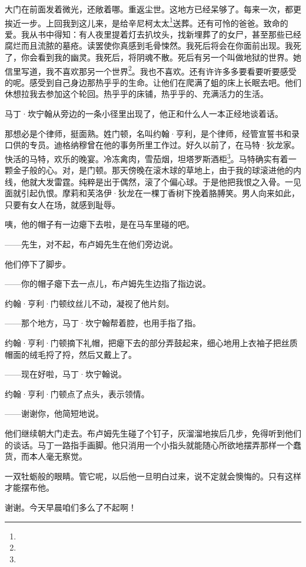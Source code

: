 \par 大门在前面发着微光，还敞着哪。重返尘世。这地方已经呆够了。每来一次，都更挨近一步。上回我到这儿来，是给辛尼柯太太\footnote{}送葬。还有可怜的爸爸。致命的爱。我从书中得知：有人夜里提着灯去扒坟头，找新埋葬了的女尸，甚至那些已经腐烂而且流脓的墓疮。读罢使你真感到毛骨悚然。我死后将会在你面前出现。我死了，你会看到我的幽灵。我死后，将阴魂不散。死后有另一个叫做地狱的世界。她信里写道，我不喜欢那另一个世界\footnote{}。我也不喜欢。还有许许多多要看要听要感受的呢。感受到自己身边那热乎乎的生命。让他们在爬满了蛆的床上长眠去吧。他们休想拉我去参加这个轮回。热乎乎的床铺，热乎乎的、充满活力的生活。
\par 马丁·坎宁翰从旁边的一条小径里出现了，他正和什么人一本正经地谈着话。
\par 那想必是个律师，挺面熟。姓门顿，名叫约翰·亨利，是个律师，经管宣誓书和录口供的专员。迪格纳穆曾在他的事务所里工作过。好久以前了，在马特·狄龙家。快活的马特，欢乐的晚宴。冷冻禽肉，雪茄烟，坦塔罗斯酒柜\footnote{}。马特确实有着一颗金子般的心。对，是门顿。那天傍晚在滚木球的草地上，由于我的球滚进他的内线，他就大发雷霆。纯粹是出于偶然，滚了个偏心球。于是他把我恨之入骨。一见面就引起仇恨。摩莉和芙洛伊·狄龙在一棵丁香树下挽着胳膊笑。男人向来如此，只要有女人在场，就感到耻辱。
\par 咦，他的帽子有一边瘪下去啦，是在马车里碰的吧。
\par ——先生，对不起，布卢姆先生在他们旁边说。
\par 他们停下了脚步。
\par ——你的帽子瘪下去一点儿，布卢姆先生边指了指边说。
\par 约翰·亨利·门顿纹丝儿不动，凝视了他片刻。
\par ——那个地方，马丁·坎宁翰帮着腔，也用手指了指。
\par 约翰·亨利·门顿摘下礼帽，把瘪下去的部分弄鼓起来，细心地用上衣袖子把丝质帽面的绒毛捋了捋，然后又戴上了。
\par ——现在好啦，马丁·坎宁翰说。
\par 约翰·亨利·门顿点了点头，表示领情。
\par ——谢谢你，他简短地说。
\par 他们继续朝大门走去。布卢姆先生碰了个钉子，灰溜溜地挨后几步，免得听到他们的谈话。马丁一路指手画脚。他只消用一个小指头就能随心所欲地摆弄那样一个蠢货，而本人毫无察觉。
\par 一双牡蛎般的眼睛。管它呢，以后他一旦明白过来，说不定就会懊悔的。只有这样才能摆布他。
\par 谢谢。今天早晨咱们多么了不起啊！



